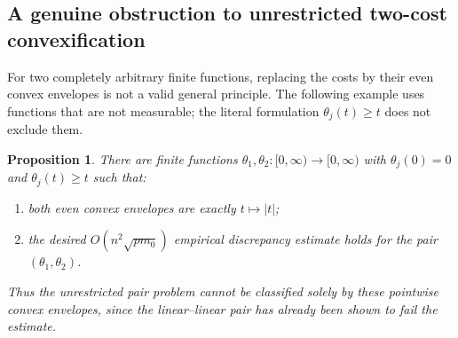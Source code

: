 \documentclass[11pt]{article}
\newtheorem{proposition}[theorem]{Proposition}
\numberwithin{equation}{section}
\begin{document}
\subsection{A genuine obstruction to unrestricted two-cost convexification}
\label{sec:hamel-pair-pathology}

For two completely arbitrary finite functions, replacing the costs by
their even convex envelopes is not a valid general principle. The
following example uses functions that are not measurable; the literal
formulation $\theta_j(t)\ge t$ does not exclude them.

\begin{proposition}\label{prop:hamel-pair-pathology}
There are finite functions $\theta_1,\theta_2:[0,\infty)\to[0,\infty)$
with $\theta_j(0)=0$ and $\theta_j(t)\ge t$ such that:
\begin{enumerate}
\item both even convex envelopes are exactly $t\mapsto|t|$;
\item the desired $O(n^2\sqrt{pm_0})$ empirical discrepancy estimate
holds for the pair $(\theta_1,\theta_2)$.
\end{enumerate}
Thus the unrestricted pair problem cannot be classified solely by
these pointwise convex envelopes, since the linear--linear pair has
already been shown to fail the estimate.
\end{proposition}
\end{document}
